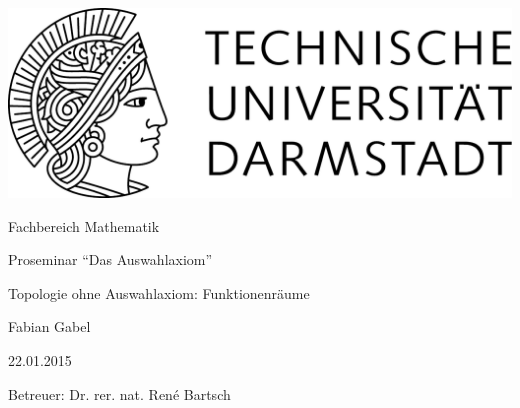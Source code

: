 \begin{titlepage}
  \begin{center}
    \vspace{1cm}
    \includegraphics[width=0.5\linewidth]{TU_Darmstadt_Logo.pdf}
    \vspace{12pt}
    
    \large{Fachbereich Mathematik}
    \vspace{2cm}
    
    \large{Proseminar ``Das Auswahlaxiom''}
    \vspace{2cm}

    \huge{Topologie ohne Auswahlaxiom: Funktionenräume}
    \vspace*{2cm}    
    
		\large
    Fabian Gabel
    \vspace*{.5cm}

    22.01.2015
    \vspace*{1cm}

    Betreuer: Dr. rer. nat. René Bartsch

    \vspace*{.5cm}

  \end{center}
\end{titlepage}
\vspace*{\fill}
